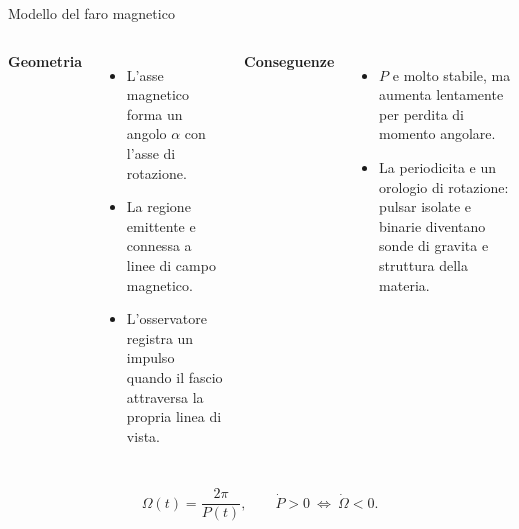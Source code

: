 \begin{frame}[t]{Modello del faro magnetico}
\small
\begin{columns}[T,onlytextwidth]
\textbf{Geometria}
\begin{itemize}
\item L'asse magnetico forma un angolo $\alpha$ con l'asse di rotazione.
\item La regione emittente e connessa a linee di campo magnetico.
\item L'osservatore registra un impulso quando il fascio attraversa la propria linea di vista.
\end{itemize}
\textbf{Conseguenze}
\begin{itemize}
\item $P$ e molto stabile, ma aumenta lentamente per perdita di momento angolare.
\item La periodicita e un orologio di rotazione: pulsar isolate e binarie diventano sonde di gravita e struttura della materia.
\end{itemize}
\end{columns}
\[
\Omega(t)=\frac{2\pi}{P(t)},\qquad\dot P>0\ \Longleftrightarrow\ \dot\Omega<0.
\]
\end{frame}

